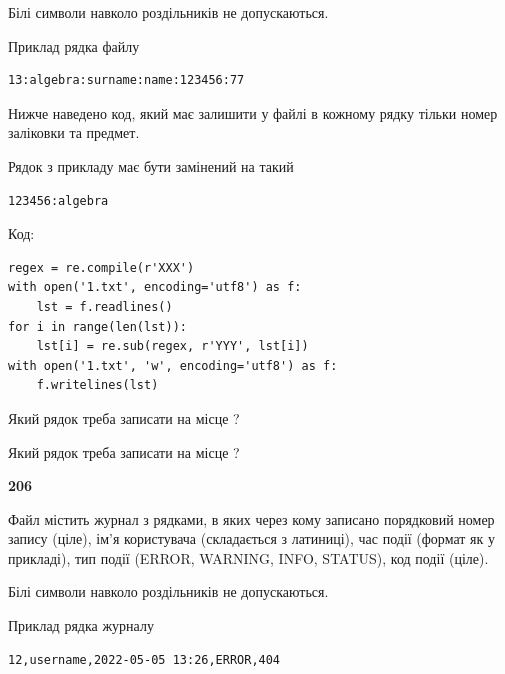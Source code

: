 Білі символи навколо роздільників не допускаються.

Приклад рядка файлу



\begin{verbatim}
13:algebra:surname:name:123456:77
\end{verbatim}


Нижче наведено код, який має залишити у файлі в кожному рядку тільки номер заліковки та предмет.

Рядок з прикладу має бути замінений на такий



\begin{verbatim}
123456:algebra
\end{verbatim}




Код:



\begin{verbatim}
regex = re.compile(r'XXX')
with open('1.txt', encoding='utf8') as f:
    lst = f.readlines()
for i in range(len(lst)):
    lst[i] = re.sub(regex, r'YYY', lst[i])
with open('1.txt', 'w', encoding='utf8') as f:
    f.writelines(lst)
\end{verbatim}









Який рядок треба записати на місце  ?\par
\vspace{5mm}


Який рядок треба записати на місце  ?\par


\newpage

{\begin {center}\textbf{ 206}\end {center}}\par
Файл  містить журнал з рядками, в яких через кому записано поряд\-ко\-вий номер запису (ціле), ім'я користувача (складається з латиниці), час події (фор\-мат як у прикладі), тип події (ERROR, WARNING, INFO, STATUS), код події (ціле).

Білі символи навколо роздільників не допускаються.

Приклад рядка журналу



\begin{verbatim}
12,username,2022-05-05 13:26,ERROR,404
\end{verbatim}


